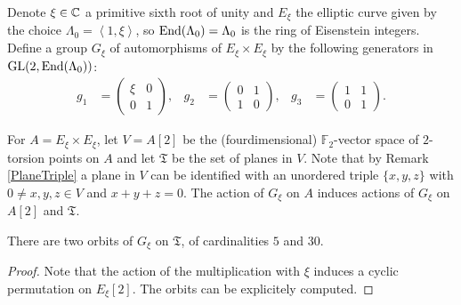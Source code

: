 \begin{definition}
Denote $\xi\in\mathbb{C}$ a primitive sixth root of unity and $E_\xi$ the elliptic curve given by the choice $\Lambda_0 = \left<1,\xi\right>$, so $\operatorname{End}(\Lambda_0)=\Lambda_0$ is the ring of Eisenstein integers. Define a group $G_\xi$ of automorphisms of $E_\xi\times E_\xi$ by the following generators in $\operatorname{GL}(2,\operatorname{End}(\Lambda_0))$:
\begin{align*}
g_1 &= \left( {\begin{array}{cc}
   \xi & 0 \\       0 & 1      
   \end{array} } \right),
 &
g_2 &= \left( {\begin{array}{cc}
   0 & 1 \\       1 & 0      
   \end{array} } \right),
 &
g_3 &= \left( {\begin{array}{cc}
   1 & 1 \\       0 & 1     
   \end{array} } \right).
\end{align*}
\end{definition}
For $A=E_\xi\times E_\xi$, let $V =A[2]$ be the (fourdimensional) $\mathbb F_2$-vector space of $2$-torsion points on $A$ and let $\mathfrak T$ be the set of planes in $V$. Note that by Remark \ref{PlaneTriple} a plane in $V$ can be identified with an unordered triple $\{x,y,z\}$ with $0\neq x,y,z\in V$ and $x+y+z=0$. The action of $G_\xi$ on $A$ induces actions of $G_\xi$ on $A[2]$ and $\mathfrak T$. 
\begin{proposition} 
There are two orbits of $G_\xi$ on $\mathfrak T$, of cardinalities $5$ and $30$.
\end{proposition}
\begin{proof}
Note that the action of the multiplication with $\xi$ induces a cyclic permutation on $E_\xi[2]$. The orbits can be explicitely computed.
\end{proof}

